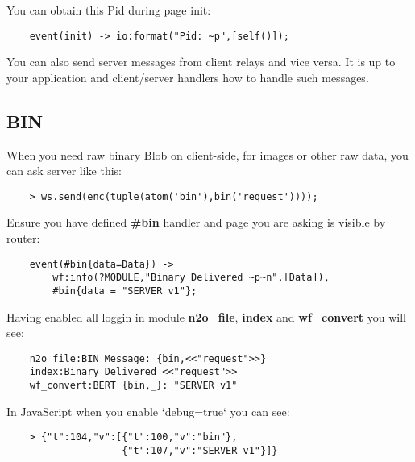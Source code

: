You can obtain this Pid during page init:

\begin{lstlisting}
    event(init) -> io:format("Pid: ~p",[self()]);
\end{lstlisting}

You can also send server messages from client relays and vice versa.
It is up to your application and client/server handlers how to handle such messages.

\newpage
\subsection{BIN}

When you need raw binary Blob on client-side,
for images or other raw data, you can ask server like this:

\vspace{1\baselineskip}
\begin{lstlisting}
    > ws.send(enc(tuple(atom('bin'),bin('request'))));
\end{lstlisting}
\vspace{1\baselineskip}

Ensure you have defined {\bf \#bin} handler and page you are
asking is visible by router:

\vspace{1\baselineskip}
\begin{lstlisting}
    event(#bin{data=Data}) ->
        wf:info(?MODULE,"Binary Delivered ~p~n",[Data]),
        #bin{data = "SERVER v1"};
\end{lstlisting}
\vspace{1\baselineskip}

Having enabled all loggin in module {\bf n2o\_file}, {\bf index} and {\bf wf\_convert}
you will see:

\vspace{1\baselineskip}
\begin{lstlisting}
    n2o_file:BIN Message: {bin,<<"request">>}
    index:Binary Delivered <<"request">>
    wf_convert:BERT {bin,_}: "SERVER v1"
\end{lstlisting}
\vspace{1\baselineskip}

In JavaScript when you enable `debug=true` you can see:

\vspace{1\baselineskip}
\begin{lstlisting}
    > {"t":104,"v":[{"t":100,"v":"bin"},
                    {"t":107,"v":"SERVER v1"}]}
\end{lstlisting}
\vspace{1\baselineskip}

